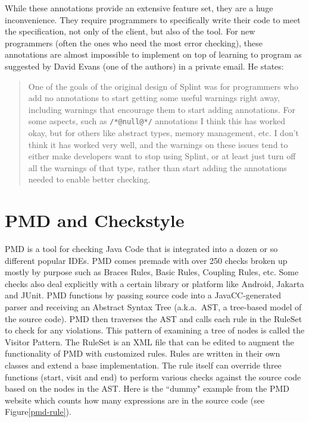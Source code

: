 \documentclass[12pt]{report}
\newcommand{\todoin}{\todo[inline]}
\def\lstlistingname{Figure}
\newcommand{\refCode}{\lstlistingname \hspace{1mm}}
\begin{document}
While these annotations provide an extensive feature set, they are a huge inconvenience. They 
require programmers to specifically write their code to meet the specification, not only of the client, but 
also of the tool. For new programmers (often the ones who need the most error checking), these 
annotations are almost impossible to implement on top of learning to program as suggested by  
David Evans (one of the authors) in a private email. He states:
\begin{quote} \singlespacing
One of the goals of the original design of 
Splint was for programmers who add no annotations to start getting some useful warnings right away, 
including warnings that encourage them to start adding annotations.  For some aspects, such as 
\lstinline{/*@null@*/} annotations I think this has worked okay, but for others like abstract types, 
memory management, etc. I don't think it has worked very well, and the warnings on these issues tend 
to either make developers want to stop using Splint, or at least just turn off all the warnings of that type, 
rather than start adding the annotations needed to enable better checking.\cite{evans-email} 
\end{quote}

\section{PMD and Checkstyle}
PMD is a tool for checking Java Code that is integrated into a dozen or so different popular IDEs.
PMD comes premade with over 250 checks broken up mostly by purpose such as Braces Rules, 
Basic Rules, Coupling Rules, etc. Some checks also deal explicitly with a certain 
library or platform like Android, Jakarta and JUnit. PMD functions by passing source code into a 
JavaCC-generated parser and receiving an Abstract Syntax Tree (a.k.a.\ AST, a tree-based model of 
the source code). PMD then traverses the AST and calls each rule in the RuleSet to check for any
violations. This pattern of examining a tree of nodes is called the Visitor Pattern\cite{design-patterns}. 
The RuleSet is an XML file that can be edited to augment the functionality of PMD with customized 
rules. Rules are written in their own classes and extend a base implementation. The rule itself can 
override three functions (start, visit and end) to perform various checks against the source code based 
on the nodes in the AST. Here is the ``dummy" example from the PMD website which counts how 
many expressions are in the source code (see \refCode \ref{pmd-rule}).
\todoin{why PMD doesn't work}
\end{document}
